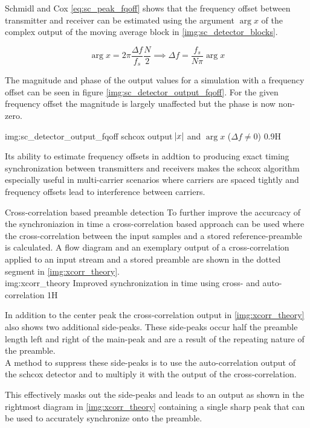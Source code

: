 \begin{subchapter}{Schmidl and Cox}
  \autoref{eq:sc_peak_fqoff} shows that the frequency offset between transmitter
  and receiver can be estimated using the argument $\arg{x}$ of the complex output of the
  moving average block in \autoref{img:sc_detector_blocks}.

  \begin{equation*}
    \arg{x} = 2 \pi \frac{\Delta f}{f_s} \frac{N}{2} \implies \Delta f = \frac{f_s}{N \pi} \arg{x}
  \end{equation*}

  The magnitude and phase of the output values for a simulation with a
  frequency offset can be seen in figure \ref{img:sc_detector_output_fqoff}.
  For the given frequency offset the magnitude is largely unaffected but
  the phase is now non-zero.

               {img:sc_detector_output_fqoff}
               {\acrshort{schcox} output $\abs{x}$ and $\arg{x}$ ($\Delta f \neq 0$)}
               {0.9}{H}
\end{subchapter}

Its ability to estimate frequency offsets in addtion to producing
exact timing synchronization between transmitters and
receivers makes the \acrshort{schcox} algorithm especially useful
in multi-carrier scenarios where carriers are spaced tightly and
frequency offsets lead to interference between carriers.

\begin{subchapter}{Cross-correlation based preamble detection}
  \label{sec:xcorrtheo}
  To further improve the accurcacy of the synchroniazion in time
  a cross-correlation based approach can be used where the cross-correlation
  between the input samples and a stored reference-preamble is
  calculated.
  A flow diagram and an exemplary output of a cross-correlation
  applied to an input stream and a stored preamble are shown
  in the dotted segment in \autoref{img:xcorr_theory}. \\

               {img:xcorr_theory}
               {Improved synchronization in time using cross- and auto-correlation}
               {1}{H}

  In addition to the center peak the cross-correlation output
  in \autoref{img:xcorr_theory} also shows two additional side-peaks.
  These side-peaks occur half the preamble length left and right
  of the main-peak and are a result of the repeating nature of
  the preamble. \\

  A method to suppress these side-peaks is to use the auto-correlation
  output of the \gls{schcox} detector and to multiply it with the
  output of the cross-correlation\cite{awoseyila}.

  This effectively masks out the side-peaks and leads to an output as
  shown in the rightmost diagram in \autoref{img:xcorr_theory} containing
  a single sharp peak that can be used to accurately synchronize
  onto the preamble.
\end{subchapter}

